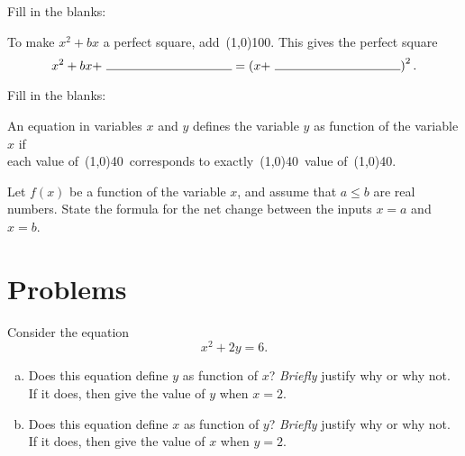 \documentclass[12pt]{amsart}
\begin{document}
\newpage

\begin{thm}[3 Points]\label{ex4}
  Fill in the blanks:\\
  \begin{center}
    To make $x^2 + bx$ a perfect square, add\ \line(1,0){100}.
    This gives the perfect square
    \vspace{.5in}
    $$x^2 + bx +\ \line(1,0){100} = \left(x +\ \line(1,0){100}\right)^2.$$
  \end{center}
\end{thm}
\vspace{.5in}
\begin{thm}[3 Points]\label{ex5}
  Fill in the blanks:\\
  \begin{center}
    An equation in variables $x$ and $y$ defines the variable $y$ as function of the variable $x$ if\\
    \vspace{.2in}
    each value of\ \line(1,0){40}\ corresponds to exactly\ \line(1,0){40}\ value of\ \line(1,0){40}.
  \end{center}
  \vspace{1in}
\end{thm}
\vspace{.5in}
\begin{thm}[3 Points]\label{ex6}
  Let $f(x)$ be a function of the variable $x$, and assume that $a \leq b$ are real numbers.
  State the formula for the net change between the inputs $x = a$ and $x = b$.
\end{thm}

\newpage
\section{Problems}
\begin{thm}[16 Points]\label{ex7}
  Consider the equation
  $$x^2 + 2y = 6.$$
  \begin{enumerate}[(a)]
    \item
      Does this equation define $y$ as function of $x$?  
      \emph{Briefly} justify why or why not.
      If it does, then give the value of $y$ when $x = 2$.
      \vspace{2in}
    \item
      Does this equation define $x$ as function of $y$?  \emph{Briefly} justify why or why not.
      If it does, then give the value of $x$ when $y = 2$.
      \vspace{2in}
  \end{enumerate}
\end{thm}
\end{document}
